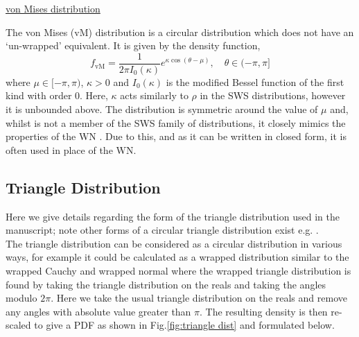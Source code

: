 \documentclass[english]{article}
\begin{document}
\begin{appendices}
\noindent\underline{von Mises distribution}

\noindent The von Mises (vM) distribution is a circular distribution which does not have an `un-wrapped' equivalent.  It is given by the density function,
\begin{equation}
f_{\text{vM}}=\frac{1}{2\pi I_0(\kappa)}e^{\kappa\cos(\theta-\mu)},\quad \theta\in(-\pi,\pi]
\end{equation}
where $\mu\in[-\pi,\pi)$, $\kappa>0$ and $I_0(\kappa)$ is the modified Bessel function of the first kind with order 0.  Here, $\kappa$ acts similarly to $\rho$ in the SWS distributions, however it is unbounded above.  The distribution is  symmetric around the value of $\mu$ and, whilst is not a member of the SWS family of distributions, it closely mimics the properties of the WN \citep{codling2010d,collett1981discriminating,stephens1963random}.  Due to this, and as it can be written in closed form, it is often used in place of the WN.

\subsection{Triangle Distribution}
Here we give details regarding the form of the triangle distribution used in the manuscript; note other forms of a circular triangle distribution exist e.g. \cite{jammalamadaka2001topics,circular}.\\

The triangle distribution can be considered as a circular distribution in various ways, for example it could be calculated as a wrapped distribution similar to the wrapped Cauchy and wrapped normal where the wrapped triangle distribution is found by taking the triangle distribution on the reals and taking the angles modulo $2\pi$.  Here we take the usual triangle distribution on the reals and  remove any angles with absolute value greater than $\pi$.  The resulting density is then re-scaled to give a PDF as shown in Fig.\ref{fig:triangle dist} and formulated below.\\


\end{appendices}
\end{document}
